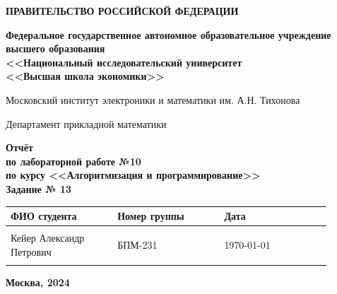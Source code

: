 \documentclass[12pt]{article}
\begin{document}
	
	\thispagestyle{empty}
	\begin{center}
		\textbf{ПРАВИТЕЛЬСТВО РОССИЙСКОЙ ФЕДЕРАЦИИ}
		
		\vspace{5ex}
		
		\textbf{Федеральное государственное автономное образовательное учреждение \\ высшего образования \\ <<Национальный исследовательский университет \\ <<Высшая школа экономики>>}
	\end{center}
	\vspace{5ex}
	
	\begin{center}
		Московский институт электроники и математики им. А.Н. Тихонова  
		
		\vspace{5ex}
		
		Департамент прикладной математики
		
		\vspace{10ex}
		\textbf{Отчёт \\ по лабораторной работе №10 \\ по курсу <<Алгоритмизация и программирование>> \\ Задание № 13}
		\vspace{7ex}
		
	\end{center}
	
	\begin{center} 
		\begin{tabular}{| p{0.3\linewidth}| p{0.3\linewidth}| p{0.3\linewidth}|}
			\hline	
			ФИО студента & Номер группы & Дата \\  \hline
			& & \\  
			Кейер Александр \newline Петрович & БПМ-231 & \today\\  
			& & \\  \hline		
		\end{tabular}
	\end{center}
	
	\begin{center}
		\vspace{3ex}
		
		\vfill
		
		\normalsize
		
		\textbf{Москва, 2024}
	\end{center}
	
\end{document}
